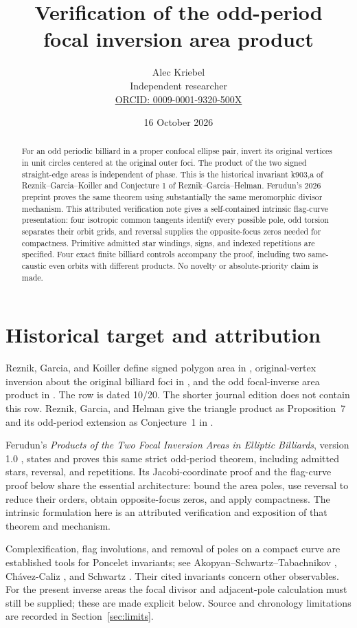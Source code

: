 \documentclass[11pt]{article}
\title{Verification of the odd-period\protect\\ focal inversion area product}
\author{Alec Kriebel\\[3pt]\small Independent researcher\\
\small\href{https://orcid.org/0009-0001-9320-500X}{ORCID: 0009-0001-9320-500X}}
\date{16 October 2026}
\begin{document}
\maketitle
\begin{abstract}
For an odd periodic billiard in a proper confocal ellipse pair, invert its
original vertices in unit circles centered at the original outer foci.
The product of the two signed straight-edge areas is independent of phase.
This is the historical invariant k903,a of Reznik--Garcia--Koiller and
Conjecture 1 of Reznik--Garcia--Helman. Ferudun's 2026 preprint proves the
same theorem using substantially the same meromorphic divisor mechanism.
This attributed verification note gives a self-contained intrinsic
flag-curve presentation: four isotropic common tangents identify every
possible pole, odd torsion separates their orbit grids, and reversal
supplies the opposite-focus zeros needed for compactness.
Primitive admitted star windings, signs, and indexed repetitions are
specified. Four exact finite billiard controls accompany the proof,
including two same-caustic even orbits with different products.
No novelty or absolute-priority claim is made.
\end{abstract}

\section{Historical target and attribution}

Reznik, Garcia, and Koiller define signed polygon area in
\cite[Eq.~(1)]{RGK}, original-vertex inversion about the original billiard
foci in \cite[\S3.9]{RGK}, and the odd focal-inverse area product in
\cite[Table~10, p.~12, k903,a]{RGK}. The row is dated 10/20. The shorter
journal edition does not contain this row. Reznik, Garcia, and Helman give
the triangle product as Proposition~7 and its odd-period extension as
Conjecture~1 in \cite[p.~6]{RGH}.

Ferudun's \emph{Products of the Two Focal Inversion Areas in Elliptic
Billiards}, version 1.0 \cite{Ferudun}, states and proves this same
strict odd-period theorem, including admitted stars, reversal, and
repetitions. Its Jacobi-coordinate proof and the flag-curve proof below
share the essential architecture: bound the area poles, use reversal to
reduce their orders, obtain opposite-focus zeros, and apply compactness.
The intrinsic formulation here is an attributed verification and
exposition of that theorem and mechanism.

Complexification, flag involutions, and removal of poles on a compact
curve are established tools for Poncelet invariants; see
Akopyan--Schwartz--Tabachnikov \cite{AST}, Ch\'avez-Caliz \cite{Chavez},
and Schwartz \cite{Schwartz}. Their cited invariants concern other
observables. For the present inverse areas the focal divisor and
adjacent-pole calculation must still be supplied; these are made explicit
below. Source and chronology limitations are recorded in Section~\ref{sec:limits}.
\end{document}
